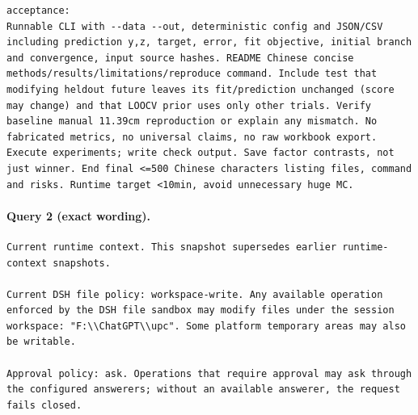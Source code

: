 \documentclass[UTF8,10pt]{ctexart}
\begin{document}
\begin{Verbatim}[breaklines=true,breakanywhere=true,fontsize=\scriptsize,frame=single,framesep=2pt]
acceptance:
Runnable CLI with --data --out, deterministic config and JSON/CSV including prediction y,z, target, error, fit objective, initial branch and convergence, input source hashes. README Chinese concise methods/results/limitations/reproduce command. Include test that modifying heldout future leaves its fit/prediction unchanged (score may change) and that LOOCV prior uses only other trials. Verify baseline manual 11.39cm reproduction or explain any mismatch. No fabricated metrics, no universal claims, no raw workbook export. Execute experiments; write check output. Save factor contrasts, not just winner. End final <=500 Chinese characters listing files, command and risks. Runtime target <10min, avoid unnecessary huge MC.
\end{Verbatim}

\paragraph{Query 2 (exact wording).}
\begin{Verbatim}[breaklines=true,breakanywhere=true,fontsize=\scriptsize,frame=single,framesep=2pt]
Current runtime context. This snapshot supersedes earlier runtime-context snapshots.

Current DSH file policy: workspace-write. Any available operation enforced by the DSH file sandbox may modify files under the session workspace: "F:\\ChatGPT\\upc". Some platform temporary areas may also be writable.

Approval policy: ask. Operations that require approval may ask through the configured answerers; without an available answerer, the request fails closed.
\end{Verbatim}
\end{document}
